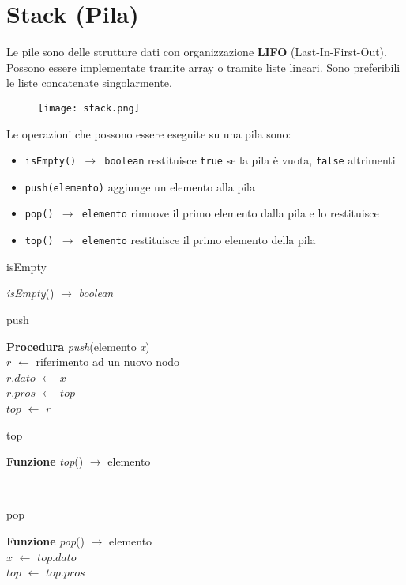 \section{Stack (Pila)}
Le pile sono delle strutture dati con organizzazione {\textbf{LIFO}}
(Last-In-First-Out).\newline
Possono essere implementate tramite array o tramite liste lineari. Sono
preferibili le liste concatenate singolarmente. \\[2pt]

\begin{wrapfigure}{r}{7cm}
    \texttt{[image: stack.png]}
\end{wrapfigure}


Le operazioni che possono essere eseguite su una pila sono:
\begin{itemize}
    \item {\texttt{isEmpty() $\rightarrow$ boolean}} restituisce \verb|true| se la pila è vuota, \verb|false| altrimenti
    \item {\texttt{push(elemento)}} aggiunge un elemento alla pila
    \item {\texttt{pop() $\rightarrow$ elemento}} rimuove il primo elemento dalla pila e lo restituisce
    \item {\texttt{top() $\rightarrow$ elemento}} restituisce il primo elemento della pila
\end{itemize}


\begin{algorithm}
    \caption{isEmpty}
     {\emph{isEmpty}}() $\rightarrow$ {\emph{boolean}}\\
       \Indp{}
\end{algorithm}

\begin{algorithm}
    \caption{push}
    \Indm\textbf{Procedura} \emph{push}(elemento \emph{x})\\
    \Indp$r$ $\leftarrow$ riferimento ad un nuovo nodo\\
    $r.dato$ $\leftarrow$ $x$\\
    $r.pros$ $\leftarrow$ $top$\\
    $top$ $\leftarrow$ $r$\\
    
\end{algorithm}

\begin{algorithm}
    \caption{top}
    \Indm\textbf{Funzione} \emph{top}() $\rightarrow$ elemento\\
    \Indp{}
\end{algorithm}
\text{}\\[30pt]

\begin{algorithm}
    \caption{pop}
    \Indm\textbf{Funzione} \emph{pop}() $\rightarrow$ elemento\\
    \Indp$x$ $\leftarrow$ $top.dato$\\
    $top$ $\leftarrow$ $top.pros$\\
\end{algorithm}